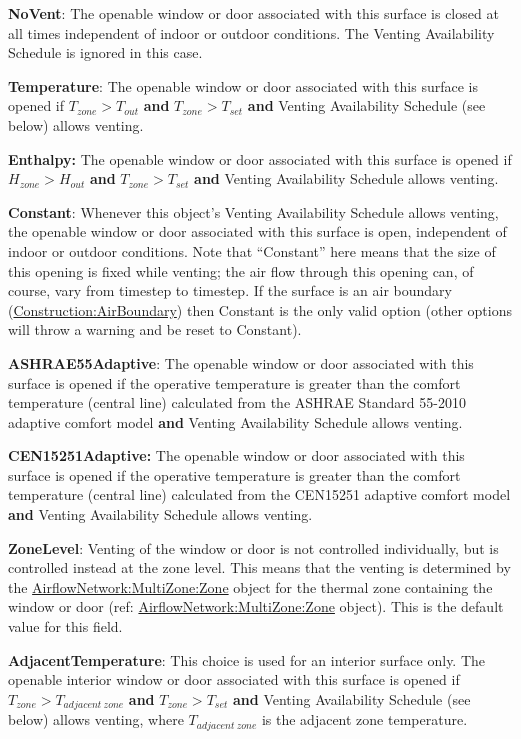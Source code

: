 \textbf{NoVent}: The openable window or door associated with this surface is
closed at all times independent of indoor or outdoor conditions. The
Venting Availability Schedule is ignored in this case.

\textbf{Temperature}: The openable window or door associated with this surface
is opened if $T_{zone} > T_{out}$ \textbf{and} $T_{zone} > T_{set}$ \textbf{and}
Venting Availability Schedule (see below) allows venting.

\textbf{Enthalpy:} The openable window or door associated with this surface is
opened if $H_{zone} > H_{out}$ \textbf{and} $T_{zone} > T_{set}$ \textbf{and}
Venting Availability Schedule allows venting.

\textbf{Constant}: Whenever this object's Venting Availability Schedule allows venting, the openable window or door associated with this surface is open, independent of indoor or outdoor conditions. Note that ``Constant'' here means that the size of this opening is fixed while venting; the air flow through this opening can, of course, vary from timestep to timestep. If the surface is an air boundary (\hyperref[constructionairboundary]{Construction:AirBoundary}) then Constant is the only valid option (other options will throw a warning and be reset to Constant).

\textbf{ASHRAE55Adaptive}: The openable window or door associated with this surface is opened if the operative temperature is greater than the comfort temperature (central line) calculated from the ASHRAE Standard 55-2010 adaptive comfort model \textbf{and} Venting Availability Schedule allows venting.

\textbf{CEN15251Adaptive:} The openable window or door associated with this surface is opened if the operative temperature is greater than the comfort temperature (central line) calculated from the CEN15251 adaptive comfort model \textbf{and} Venting Availability Schedule allows venting.

\textbf{ZoneLevel}: Venting of the window or door is not controlled individually, but is controlled instead at the zone level. This means that the venting is determined by the \hyperref[airflownetworkmultizonezone]{AirflowNetwork:MultiZone:Zone} object for the thermal zone containing the window or door (ref: \hyperref[airflownetworkmultizonezone]{AirflowNetwork:MultiZone:Zone} object). This is the default value for this field.

\textbf{AdjacentTemperature}: This choice is used for an interior surface only.
The openable interior window or door associated with this surface is opened if
$T_{zone} > T_{adjacent\ zone}$ \textbf{and} $T_{zone} > T_{set}$ \textbf{and}
Venting Availability Schedule (see below) allows venting, where $T_{adjacent\ zone}$
is the adjacent zone temperature.

